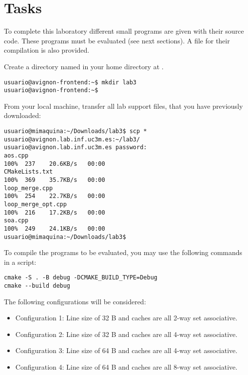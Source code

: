 \section{Tasks}

To complete this laboratory different small programs are given with their
source code. These programs must be evaluated (see next sections). A
 file for their compilation is also provided. 

Create a directory named  in your home directory at .

\begin{lstlisting}[style=terminal,aboveskip=1em,belowskip=1em]
usuario@avignon-frontend:~$ mkdir lab3
usuario@avignon-frontend:~$
\end{lstlisting}

From your local machine, transfer all lab support files, 
that you have previously downloaded:

\begin{lstlisting}[style=terminal,aboveskip=1em,belowskip=1em]
usuario@mimaquina:~/Downloads/lab3$ scp * usuario@avignon.lab.inf.uc3m.es:~/lab3/
usuario@avignon.lab.inf.uc3m.es password: 
aos.cpp                                                            100%  237    20.6KB/s   00:00    
CMakeLists.txt                                                     100%  369    35.7KB/s   00:00    
loop_merge.cpp                                                     100%  254    22.7KB/s   00:00    
loop_merge_opt.cpp                                                 100%  216    17.2KB/s   00:00    
soa.cpp                                                            100%  249    24.1KB/s   00:00    
usuario@mimaquina:~/Downloads/lab3$ 
\end{lstlisting}

To compile the programs to be evaluated, 
you may use the following commands in a script:

\begin{lstlisting}[style=terminal,aboveskip=1em,belowskip=1em]
cmake -S . -B debug -DCMAKE_BUILD_TYPE=Debug
cmake --build debug
\end{lstlisting}


The following configurations will be considered:
\begin{itemize}
\item Configuration 1: Line size of 32 B and caches are all 2-way set associative.
\item Configuration 2: Line size of 32 B and caches are all 4-way set associative.
\item Configuration 3: Line size of 64 B and caches are all 4-way set associative.
\item Configuration 4: Line size of 64 B and caches are all 8-way set associative.
\end{itemize}




